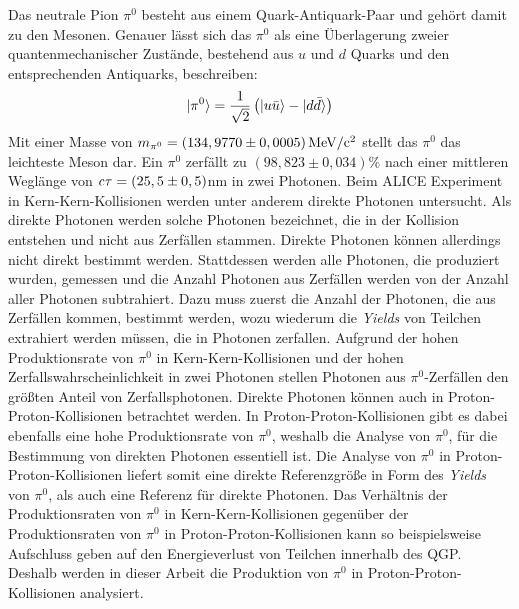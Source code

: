 Das neutrale Pion $\pi^{0}$ besteht aus einem Quark-Antiquark-Paar und geh\"ort damit zu den Mesonen.
Genauer l\"asst sich das $\pi^{0}$ als eine \"Uberlagerung zweier quantenmechanischer Zust\"ande, bestehend aus $u$ und $d$ Quarks und den entsprechenden Antiquarks, beschreiben:
\begin{align}
\lvert\pi^{0}\rangle = \frac{1}{\sqrt{2}}\left(\lvert u\bar{u}\rangle-\lvert d\bar{d}\rangle\right) \label{eq:pi0state}
\end{align}
Mit einer Masse von $m_{\pi^{0}} = \left(134,9770\pm0,0005\right) \rm{MeV}/c^{2}$ \cite{book:pdg} stellt das $\pi^{0}$ das leichteste Meson dar.
Ein ${\pi^{0}}$ zerf{\"a}llt zu $\left( 98,823\pm0,034\right)\%$ nach einer mittleren Wegl\"ange von ${\it c\tau} = (25,5\pm0,5)$nm \cite{book:pdg} in zwei Photonen.
\newline
Beim ALICE Experiment in Kern-Kern-Kollisionen werden unter anderem direkte Photonen untersucht.
Als direkte Photonen werden solche Photonen bezeichnet, die in der Kollision entstehen und nicht aus Zerf\"allen stammen.
Direkte Photonen k\"onnen allerdings nicht direkt bestimmt werden.
Stattdessen werden alle Photonen, die produziert wurden, gemessen und die Anzahl Photonen aus Zerf\"allen werden von der Anzahl aller Photonen subtrahiert.
Dazu muss zuerst die Anzahl der Photonen, die aus Zerf\"allen kommen, bestimmt werden, wozu wiederum die \textit{Yields} von Teilchen extrahiert werden m\"ussen, die in Photonen zerfallen.
Aufgrund der hohen Produktionsrate von $\pi^{0}$ in Kern-Kern-Kollisionen und der hohen Zerfallswahrscheinlichkeit in zwei Photonen stellen Photonen aus $\pi^{0}$-Zerf\"allen den gr\"o{\ss}ten Anteil von Zerfallsphotonen.
\newline
Direkte Photonen k\"onnen auch in Proton-Proton-Kollisionen betrachtet werden.
In Proton-Proton-Kollisionen gibt es dabei ebenfalls eine hohe Produktionsrate von $\pi^{0}$, weshalb die Analyse von $\pi^{0}$, f\"ur die Bestimmung von direkten Photonen essentiell ist.
Die Analyse von $\pi^{0}$ in Proton-Proton-Kollisionen liefert somit eine direkte Referenzgr\"o{\ss}e in Form des \textit{Yields} von $\pi^{0}$, als auch eine Referenz f\"ur direkte Photonen.
Das Verh\"altnis der Produktionsraten von $\pi^{0}$ in Kern-Kern-Kollisionen gegen\"uber der Produktionsraten von $\pi^{0}$ in Proton-Proton-Kollisionen kann so beispielsweise Aufschluss geben auf den Energieverlust von Teilchen innerhalb des QGP.
Deshalb werden in dieser Arbeit die Produktion von $\pi^{0}$ in Proton-Proton-Kollisionen analysiert. 
